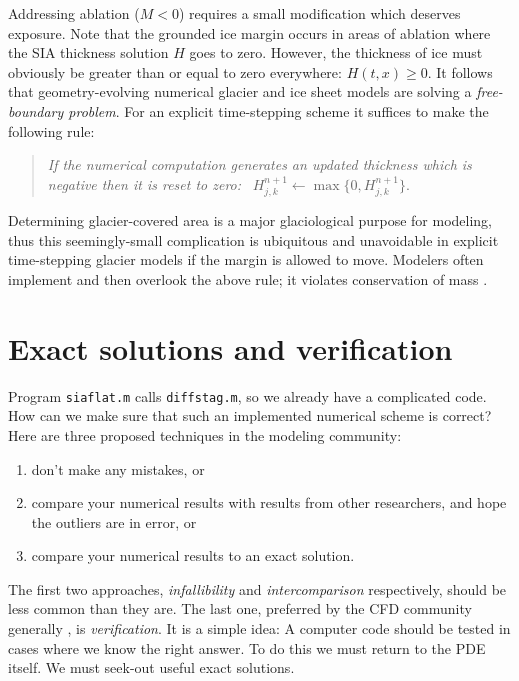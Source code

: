 \documentclass[letterpaper,final,12pt,reqno]{amsart}
\newcommand{\minput}[1]{
\vspace{0.8cm}
\VerbatimInput[frame=single,framesep=3mm,label=\fbox{\normalsize \textsl{\,#1.m\,}},fontfamily=courier,fontsize=\footnotesize]{tmp/#1.slim.m}
\vspace{0.5cm}
}
\begin{document}
\minput{siaflat}

Addressing ablation ($M<0$) requires a small modification which deserves exposure.  Note that the grounded ice margin occurs in areas of ablation where the SIA thickness solution $H$ goes to zero.  However, the thickness of ice must obviously be greater than or equal to zero everywhere: $H(t,x)\ge 0$.  It follows that geometry-evolving numerical glacier and ice sheet models are solving a \emph{free-boundary problem}.  For an explicit time-stepping scheme it suffices to make the following rule:
\begin{quote}
\emph{If the numerical computation generates an updated thickness which is negative then it is reset to zero:} \, $H_{j,k}^{n+1} \gets \max\{0,H_{j,k}^{n+1}\}$.
\end{quote}
Determining glacier-covered area is a major glaciological purpose for modeling, thus this seemingly-small complication is ubiquitous and unavoidable in explicit time-stepping glacier models if the margin is allowed to move.  Modelers often implement and then overlook the above rule; it violates conservation of mass \cite{Bueler2021conservation}.


\section{Exact solutions and verification} \label{sec:exactsolutions}

Program \texttt{siaflat.m} calls \texttt{diffstag.m}, so we already have a complicated code.  How can we make sure that such an implemented numerical scheme is correct?  Here are three proposed techniques in the modeling community:
\begin{enumerate}
  \item don't make any mistakes, or
  \item compare your numerical results with results from other researchers, and hope the outliers are in error, or
  \item compare your numerical results to an exact solution.   \end{enumerate}
The first two approaches, \emph{infallibility} and \emph{intercomparison} respectively, should be less common than they are.  The last one, preferred by the CFD community generally \cite{Roache,Wesseling}, is \emph{verification}.  It is a simple idea:  A computer code should be tested in cases where we know the right answer.  To do this we must return to the PDE itself.  We must seek-out useful exact solutions.
\end{document}
